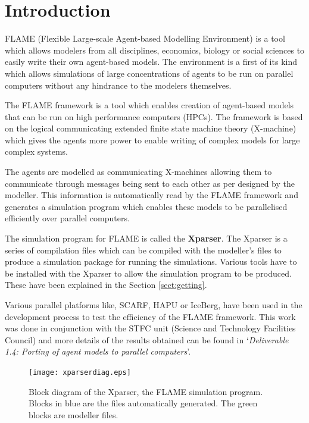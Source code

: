 \documentclass[a4paper,11pt]{article}
\begin{document}
\section{Introduction}

FLAME (Flexible Large-scale Agent-based Modelling Environment) is a
tool which allows modelers from all disciplines, economics, biology
or social sciences to easily write their own agent-based models. The
environment is a first of its kind which allows simulations of large
concentrations of agents to be run on parallel computers without any
hindrance to the modelers themselves.


The FLAME framework is a tool which enables creation of agent-based
models that can be run on high performance computers (HPCs). The
framework is based on the logical communicating extended finite
state machine theory (X-machine) which gives the agents more power
to enable writing of complex models for large complex systems.

The agents are modelled as communicating X-machines allowing them to
communicate through messages being sent to each other as per
designed by the modeller. This information is automatically read by
the FLAME framework and generates a simulation program which enables
these models to be parallelised efficiently over parallel computers.

The simulation program for FLAME is called the \textbf{Xparser}. The
Xparser is a series of compilation files which can be compiled with
the modeller's files to produce a simulation package for running the
simulations. Various tools have to be installed with the Xparser to
allow the simulation program to be produced. These have been
explained in the Section \ref{sect:getting}.

Various parallel platforms like, SCARF, HAPU or IceBerg, have been
used in the development process to test the efficiency of the FLAME
framework. This work was done in conjunction with the STFC unit
(Science and Technology Facilities Council) and more details of the
results obtained can be found in `\emph{Deliverable 1.4: Porting of
agent models to parallel computers}'.


\begin{figure}[!htb]
\begin{center}
  \texttt{[image: xparserdiag.eps]}
  \caption{Block diagram of the Xparser, the FLAME simulation program. Blocks in blue are the files automatically generated. The green blocks are modeller files.}
  \label{fig:xparserdiag}
  \end{center}
\end{figure}
\end{document}
